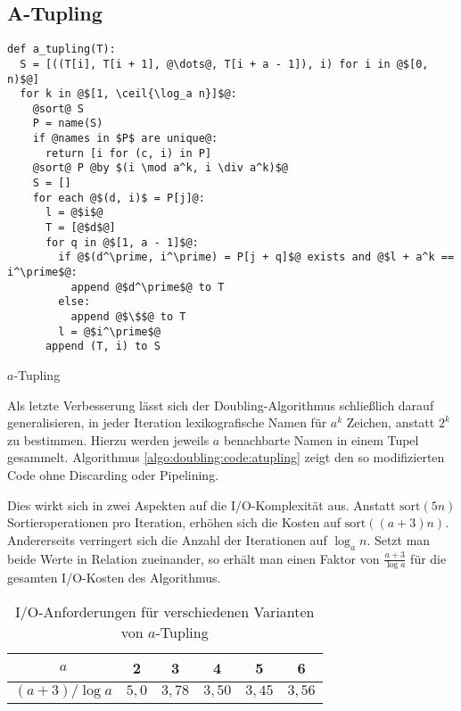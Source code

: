 \subsection{A-Tupling}
\label{algo:doubling:sec:tupling}
\begin{listing}[htp]
\begin{verbatim}
def a_tupling(T):
  S = [((T[i], T[i + 1], @\dots@, T[i + a - 1]), i) for i in @$[0, n)$@]
  for k in @$[1, \ceil{\log_a n}]$@:
    @sort@ S
    P = name(S)
    if @names in $P$ are unique@:
      return [i for (c, i) in P]
    @sort@ P @by $(i \mod a^k, i \div a^k)$@
    S = []
    for each @$(d, i)$ = P[j]@:
      l = @$i$@
      T = [@$d$@]
      for q in @$[1, a - 1]$@:
        if @$(d^\prime, i^\prime) = P[j + q]$@ exists and @$l + a^k == i^\prime$@:
          append @$d^\prime$@ to T
        else:
          append @$\$$@ to T
        l = @$i^\prime$@
      append (T, i) to S
\end{verbatim}
\caption{$a$-Tupling} 
\label{algo:doubling:code:atupling}
\end{listing}

Als letzte Verbesserung lässt sich der Doubling-Algorithmus schließlich darauf generalisieren, in jeder Iteration lexikografische Namen für $a^k$ Zeichen, anstatt $2^k$ zu bestimmen. Hierzu werden jeweils $a$ benachbarte Namen in einem Tupel gesammelt. Algorithmus \ref{algo:doubling:code:atupling} zeigt den so modifizierten Code ohne Discarding oder Pipelining.

Dies wirkt sich in zwei Aspekten auf die I/O-Komplexität aus. Anstatt $\text{sort}(5n)$ Sortieroperationen pro Iteration, erhöhen sich die Kosten auf $\text{sort}((a+3)n)$. Andererseits verringert sich die Anzahl der Iterationen auf $\log_a n$. Setzt man beide Werte in Relation zueinander, so erhält man einen Faktor von $\frac{a + 3}{\log a}$ für die gesamten I/O-Kosten des Algorithmus. 

\begin{table}
\centering
\begin{tabular}{cccccc}
\toprule
$a$ & 2 & 3 & 4 & 5 & 6 \\ 
\midrule 
$(a+3) / \log a$ & $5,0$ & $3,78$ & $3,50$ & $3,45$ & $3,56$ \\ 
\bottomrule
\end{tabular} 
\caption{I/O-Anforderungen für verschiedenen Varianten von $a$-Tupling}
\label{algo:doubling:tab:tab1}
\end{table}

